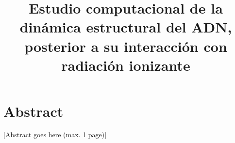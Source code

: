 \documentclass[a4paper, twoside, 12pt]{article}
\title{Estudio computacional de la dinámica estructural del
ADN, posterior a su interacción con radiación ionizante}
\begin{document}




\clearpage
\thispagestyle{empty}
\section*{Abstract}

[Abstract goes here (max. 1 page)]



\clearpage
{}
\tableofcontents
\clearpage
\listoffigures
\clearpage



















\appendix
\renewcommand*{\thesection}{\Alph{section}}\textbf{}








\clearpage
\renewcommand*{\thesection}{}\textbf{}

%
%


\end{document}
